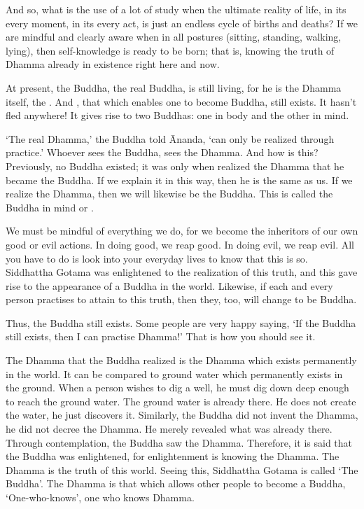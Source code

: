 And so, what is the use of a lot of study when the ultimate reality of life, in its every moment, in its every act, is just an endless cycle of births and deaths? If we are mindful and clearly aware when in all postures (sitting, standing, walking, lying), then self-knowledge is ready to be born; that is, knowing the truth of Dhamma already in existence right here and now.

At present, the Buddha, the real Buddha, is still living, for he is the Dhamma itself, the . And , that which enables one to become Buddha, still exists. It hasn't fled anywhere! It gives rise to two Buddhas: one in body and the other in mind.

`The real Dhamma,' the Buddha told \=Ananda, `can only be realized through practice.' Whoever sees the Buddha, sees the Dhamma. And how is this? Previously, no Buddha existed; it was only when  realized the Dhamma that he became the Buddha. If we explain it in this way, then he is the same as us. If we realize the Dhamma, then we will likewise be the Buddha. This is called the Buddha in mind or .

We must be mindful of everything we do, for we become the inheritors of our own good or evil actions. In doing good, we reap good. In doing evil, we reap evil. All you have to do is look into your everyday lives to know that this is so. Siddhattha Gotama was enlightened to the realization of this truth, and this gave rise to the appearance of a Buddha in the world. Likewise, if each and every person practises to attain to this truth, then they, too, will change to be Buddha.

Thus, the Buddha still exists. Some people are very happy saying, `If the Buddha still exists, then I can practise Dhamma!' That is how you should see it.

The Dhamma that the Buddha realized is the Dhamma which exists permanently in the world. It can be compared to ground water which permanently exists in the ground. When a person wishes to dig a well, he must dig down deep enough to reach the ground water. The ground water is already there. He does not create the water, he just discovers it. Similarly, the Buddha did not invent the Dhamma, he did not decree the Dhamma. He merely revealed what was already there. Through contemplation, the Buddha saw the Dhamma. Therefore, it is said that the Buddha was enlightened, for enlightenment is knowing the Dhamma. The Dhamma is the truth of this world. Seeing this, Siddhattha Gotama is called `The Buddha'. The Dhamma is that which allows other people to become a Buddha, `One-who-knows', one who knows Dhamma.


